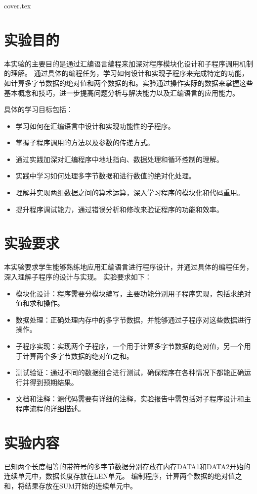 \documentclass[12pt]{article}
\begin{document}
 {cover.tex}
\section{实验目的}
本实验的主要目的是通过汇编语言编程来加深对程序模块化设计和子程序调用机制的理解。
通过具体的编程任务，学习如何设计和实现子程序来完成特定的功能，如计算多字节数据的绝对值和两个数据的和。实验通过操作实际的数据来掌握这些基本概念和技巧，进一步提高问题分析与解决能力以及汇编语言的应用能力。

具体的学习目标包括：
\begin{itemize}
    \item 学习如何在汇编语言中设计和实现功能性的子程序。
    \item 掌握子程序调用的方法以及参数的传递方式。
    \item 通过实践加深对汇编程序中地址指向、数据处理和循环控制的理解。
    \item 实践中学习如何处理多字节数据和进行数值的绝对化处理。
    \item 理解并实现两组数据之间的算术运算，深入学习程序的模块化和代码重用。
    \item 提升程序调试能力，通过错误分析和修改来验证程序的功能和效率。
\end{itemize}

\section{实验要求}
本实验要求学生能够熟练地应用汇编语言进行程序设计，并通过具体的编程任务，深入理解子程序的设计与实现。
实验要求如下：
\begin{itemize}
    \item 模块化设计：程序需要分模块编写，主要功能分别用子程序实现，包括求绝对值和求和操作。
    \item 数据处理：正确处理内存中的多字节数据，并能够通过子程序对这些数据进行操作。
    \item 子程序实现：实现两个子程序，一个用于计算多字节数据的绝对值，另一个用于计算两个多字节数据的绝对值之和。
    \item 测试验证：通过不同的数据组合进行测试，确保程序在各种情况下都能正确运行并得到预期结果。
    \item 文档和注释：源代码需要有详细的注释，实验报告中需包括对子程序设计和主程序流程的详细描述。
\end{itemize}

\section{实验内容}
已知两个长度相等的带符号的多字节数据分别存放在内存DATA1和DATA2开始的连续单元中，数据长度存放在LEN单元。
编制程序，计算两个数据的绝对值之和，将结果存放在SUM开始的连续单元中。
\end{document}
